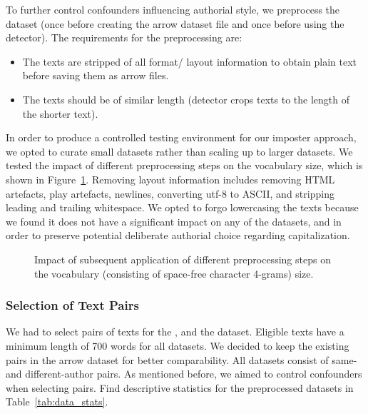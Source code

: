 To further control confounders influencing authorial style, we preprocess the dataset 
(once before creating the arrow dataset file and once before using the detector).
The requirements for the preprocessing are:
\begin{itemize}
    \item The texts are stripped of all format/ layout information to obtain plain text before saving them as arrow files.
    \item The texts should be of similar length (detector crops texts to the length of the shorter text).
\end{itemize}
In order to produce a controlled testing environment for our imposter approach, 
we opted to curate small datasets rather than scaling up to larger datasets.
We tested the impact of different preprocessing steps on the vocabulary size,
which is shown in Figure~\ref{fig:preprocesing_impact_vocab_size}.
Removing layout information includes removing HTML artefacts, play artefacts, newlines, 
converting utf-8 to ASCII, and stripping leading and trailing whitespace.
We opted to forgo lowercasing the texts because we found it does not have a significant impact on any of the datasets, 
and in order to preserve potential deliberate authorial choice regarding capitalization.

\begin{figure}[htbp]
    \centering
    
    \caption{Impact of subsequent application of different preprocessing steps on the vocabulary (consisting of space-free character 4-grams) size.}
    \label{fig:preprocesing_impact_vocab_size}
\end{figure}

\subsubsection{Selection of Text Pairs}
\label{subsubsec:dataset_text_pair_selection}

We had to select pairs of texts for the \dataBlog{}, \dataStudent{} and the \dataGutenberg{} dataset.
Eligible texts have a minimum length of \num{700} words for all datasets.
We decided to keep the existing pairs in the \dataPan{} arrow dataset for better comparability.
All datasets consist of same- and different-author pairs. 
As mentioned before, we aimed to control confounders when selecting pairs.
Find descriptive statistics for the preprocessed datasets in Table~\ref{tab:data_stats}.

